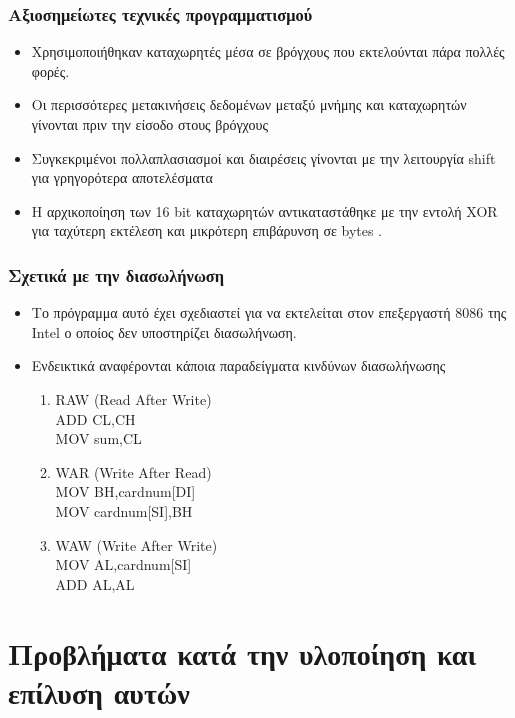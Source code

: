 \documentclass[10pt,a4paper]{article}
\begin{document}
\subsubsection*{Αξιοσημείωτες τεχνικές προγραμματισμού}
\begin{itemize}
\item Χρησιμοποιήθηκαν καταχωρητές μέσα σε βρόγχους που εκτελούνται πάρα πολλές φορές.
\item Οι περισσότερες μετακινήσεις δεδομένων μεταξύ μνήμης και καταχωρητών γίνονται πριν την είσοδο στους βρόγχους
\item Συγκεκριμένοι πολλαπλασιασμοί και διαιρέσεις γίνονται με την λειτουργία \latintext shift \greektext για γρηγορότερα αποτελέσματα
\item Η αρχικοποίηση των 16  \latintext bit \greektext καταχωρητών αντικαταστάθηκε με την εντολή \latintext XOR \greektext για ταχύτερη εκτέλεση και μικρότερη επιβάρυνση σε \latintext bytes \greektext.
\end{itemize}

\subsubsection*{Σχετικά με την διασωλήνωση}
\begin{itemize}
\item Το πρόγραμμα αυτό έχει σχεδιαστεί για να εκτελείται στον επεξεργαστή 8086 της \latintext Intel \greektext ο οποίος δεν υποστηρίζει διασωλήνωση. 
\item Ενδεικτικά αναφέρονται κάποια παραδείγματα κινδύνων διασωλήνωσης
	\latintext
	\begin{enumerate}
	\item RAW (Read After Write)\\ADD CL,CH\\MOV sum,CL
	\item WAR (Write After Read)\\MOV BH,cardnum[DI]\\MOV cardnum[SI],BH 
	\item WAW (Write After Write)\\MOV AL,cardnum[SI]\\ADD AL,AL
	\end{enumerate}
	\greektext
\end{itemize}

\section*{Προβλήματα κατά την υλοποίηση και επίλυση αυτών}
\end{document}
